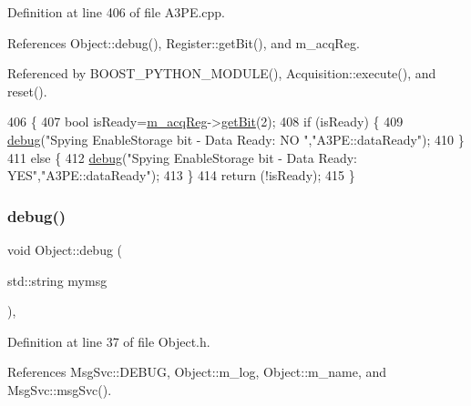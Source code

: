 Definition at line 406 of file A3\+P\+E.\+cpp.



References Object\+::debug(), Register\+::get\+Bit(), and m\+\_\+acq\+Reg.



Referenced by B\+O\+O\+S\+T\+\_\+\+P\+Y\+T\+H\+O\+N\+\_\+\+M\+O\+D\+U\+L\+E(), Acquisition\+::execute(), and reset().


\begin{DoxyCode}
406                     \{
407   \textcolor{keywordtype}{bool} isReady=\hyperlink{classA3PE_abaf426f4c9192537117b77f9f4821e04}{m\_acqReg}->\hyperlink{classRegister_a5d27c9ff548817eee097ba4fdc8e8f69}{getBit}(2);
408   \textcolor{keywordflow}{if} (isReady) \{
409     \hyperlink{classObject_aac010553f022165573714b7014a15f0d}{debug}(\textcolor{stringliteral}{"Spying EnableStorage bit - Data Ready: NO "},\textcolor{stringliteral}{"A3PE::dataReady"});
410   \}
411   \textcolor{keywordflow}{else} \{
412     \hyperlink{classObject_aac010553f022165573714b7014a15f0d}{debug}(\textcolor{stringliteral}{"Spying EnableStorage bit - Data Ready: YES"},\textcolor{stringliteral}{"A3PE::dataReady"});
413   \}
414   \textcolor{keywordflow}{return} (!isReady);
415 \}
\end{DoxyCode}
\mbox{\label{classObject_aac010553f022165573714b7014a15f0d}} 
\subsubsection{\texorpdfstring{debug()}{debug()}\hspace{0.1cm}{\footnotesize\ttfamily [1/2]}}
{\footnotesize\ttfamily void Object\+::debug (\begin{DoxyParamCaption}\item[{std\+::string}]{mymsg }\end{DoxyParamCaption})\hspace{0.3cm}{\ttfamily [inline]}, {\ttfamily [inherited]}}



Definition at line 37 of file Object.\+h.



References Msg\+Svc\+::\+D\+E\+B\+UG, Object\+::m\+\_\+log, Object\+::m\+\_\+name, and Msg\+Svc\+::msg\+Svc().



